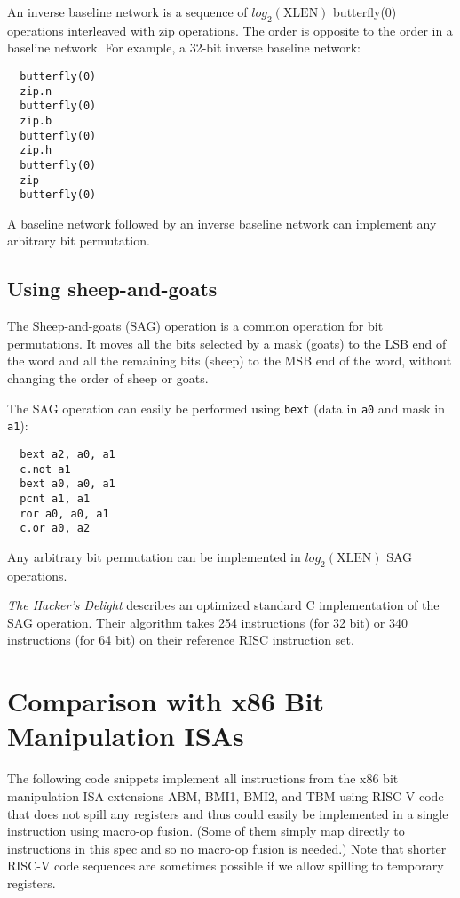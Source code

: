 An inverse baseline network is a sequence of $log_2(\textrm{XLEN})$ butterfly(0)
operations interleaved with zip operations. The order is opposite to the
order in a baseline network. For example, a 32-bit inverse baseline network:

\begin{verbatim}
  butterfly(0)
  zip.n
  butterfly(0)
  zip.b
  butterfly(0)
  zip.h
  butterfly(0)
  zip
  butterfly(0)
\end{verbatim}

A baseline network followed by an inverse baseline network can implement
any arbitrary bit permutation.


\subsection{Using sheep-and-goats}

The Sheep-and-goats (SAG) operation is a common operation for bit permutations.
It moves all the bits selected by a mask (goats) to the LSB end of the word
and all the remaining bits (sheep) to the MSB end of the word, without changing
the order of sheep or goats.

The SAG operation can easily be performed using {\tt bext} (data in {\tt a0} and
mask in {\tt a1}):

\begin{verbatim}
  bext a2, a0, a1
  c.not a1
  bext a0, a0, a1
  pcnt a1, a1
  ror a0, a0, a1
  c.or a0, a2
\end{verbatim}

Any arbitrary bit permutation can be implemented in $log_2(\textrm{XLEN})$ SAG
operations.

{\it The Hacker's Delight} describes an optimized standard C implementation of
the SAG operation. Their algorithm takes 254 instructions (for 32 bit) or 340
instructions (for 64 bit) on their reference RISC instruction
set.~\cite[p.~152f,~162f]{Seander05}


\section{Comparison with x86 Bit Manipulation ISAs}
\label{x86comp}

The following code snippets implement all instructions from the x86 bit manipulation
ISA extensions ABM, BMI1, BMI2, and TBM using RISC-V code that does not spill any
registers and thus could easily be implemented in a single instruction using macro-op
fusion. (Some of them simply map directly to instructions in this spec and so no
macro-op fusion is needed.) Note that shorter RISC-V code sequences are
sometimes possible if we allow spilling to temporary registers.

